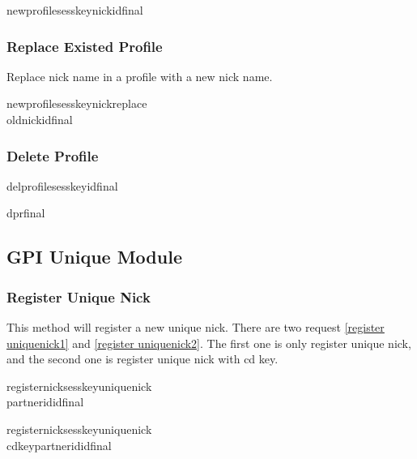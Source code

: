 \documentclass[oneside,titlepage,a4paper]{Definition/retrospy} %
\begin{document}
\begin{mybox}
	\tbs newprofile\tbs\tbs sesskey\tbs <session key>\tbs nick\tbs <nick name>\tbs id\tbs<operation id>\tbs final\tbs
\end{mybox}
\subsubsection{Replace Existed Profile}
Replace nick name in a profile with a new nick name.
\ClientRequest

\begin{mybox}
\tbs newprofile\tbs\tbs sesskey\tbs nick\tbs replace\\\tbs oldnick\tbs id\tbs final\tbs
\end{mybox}

\subsubsection{Delete Profile}
\ClientRequest

\begin{mybox}
	\tbs delprofile\tbs\tbs sesskey\tbs<session key>\tbs id\tbs<operation id>\tbs final\tbs
\end{mybox}
\ServerResponse

\begin{mybox}
	\tbs dpr\tbs final\tbs
\end{mybox}



\subsection{GPI Unique Module}

\subsubsection{Register Unique Nick}
This method will register a new unique nick. There are two request \ref{register uniquenick1} and \ref{register uniquenick2}. The first one is only register unique nick, and the second one is register unique nick with cd key.
\ClientRequest
\begin{mybox}[label=register uniquenick1]
	\tbs registernick\tbs\tbs sesskey\tbs<session key>\tbs uniquenick\tbs<unique nick>\\\tbs partnerid\tbs<partner id>\tbs id\tbs<operation id>\tbs final\tbs
\end{mybox}
\begin{mybox}[label=register uniquenick2]
	\tbs registernick\tbs\tbs sesskey\tbs<session key>\tbs uniquenick\tbs<unique nick>\\\tbs cdkey\tbs<cd key>\tbs partnerid\tbs<partner id>\tbs id\tbs<operation id>\tbs final\tbs
\end{mybox}
\end{document}
